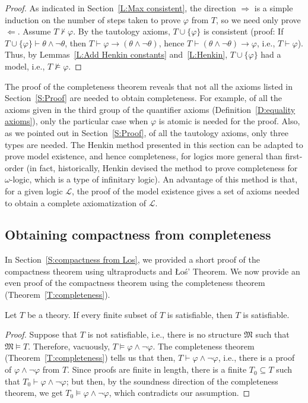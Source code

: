 \documentclass{scrartcl}
\renewcommand{\phi}{\varphi}
\newcommand{\FM}{\mathfrak{M}}
\newcommand{\SL}{\mathscr{L}}
\begin{document}
\begin{proof}
As indicated in Section~\ref{L:Max consistent}, the direction $\Rightarrow$ is a simple induction on the number of steps taken to prove $\phi$ from $T$, so we need only prove $\Leftarrow$.  
Assume $T\not \vdash \phi$. By the tautology axioms, $T\cup\{\phi\}$ is consistent (proof: If $T\cup\{\phi\}\vdash\theta\land\neg\theta$, then $T\vdash\phi\to(\theta\land\neg\theta)$, hence $T\vdash(\theta\land\neg\theta)\to \phi$, i.e., $T\vdash \phi$). Thus, by Lemmas~\ref{L:Add Henkin constants} and~\ref{L:Henkin}, $T\cup\{\phi\}$ had a model, i.e., 
$T\not\models\phi$.
\end{proof}


The proof of the completeness theorem reveals that not all the axioms listed in Section~\ref{S:Proof} are needed to obtain completeness. For example, of all the axioms given in the third group of the quantifier axioms (Definition~\ref{D:equality axioms}), only the particular case when $\phi$ is atomic is needed for the proof. Also, as we pointed out in Section~\ref{S:Proof}, of all the tautology axioms, only three types are needed. The Henkin method presented in this section can be adapted to prove model existence, and hence completeness, for logics more general than first-order (in fact, historically, Henkin devised the method to prove completeness for $\omega$-logic, which is a type of infinitary logic). An advantage of this method is that, for a given logic  $\SL$, the proof of the model existence gives a set of axioms needed to obtain a complete axiomatization of $\SL$.


\subsection{Obtaining compactness from completeness}

In Section~\ref{S:compactness from Los}, we provided a short proof of the compactness theorem using  ultraproducts and Łoś' Theorem. 
We now provide an even proof of the compactness theorem using the completeness theorem (Theorem~\ref{T:completeness}).


\begin{corollary}
\label{C:compactness from completeness 1}
Let $T$ be a theory. If every finite subset of $T$ is satisfiable, then $T$ is satisfiable.
\end{corollary}

\begin{proof}
Suppose that $T$ is not satisfiable, i.e., there is no structure $\FM$ such that $\FM\models T$. Therefore, vacuously, $T\models \phi\land\neg\phi$. The completeness theorem (Theorem~\ref{T:completeness}) tells us that then,  $T\vdash \phi\land\neg\phi$, i.e., there is a proof of $\phi\land\neg\phi$ from $T$. Since proofs are finite in length, there is a finite $T_0\subseteq T$ such that $T_0\vdash \phi\land\neg\phi$; but then, by the soundness direction of the completeness theorem, we get  $T_0\models \phi\land\neg\phi$, which contradicts our assumption.
\end{proof}
\end{document}
